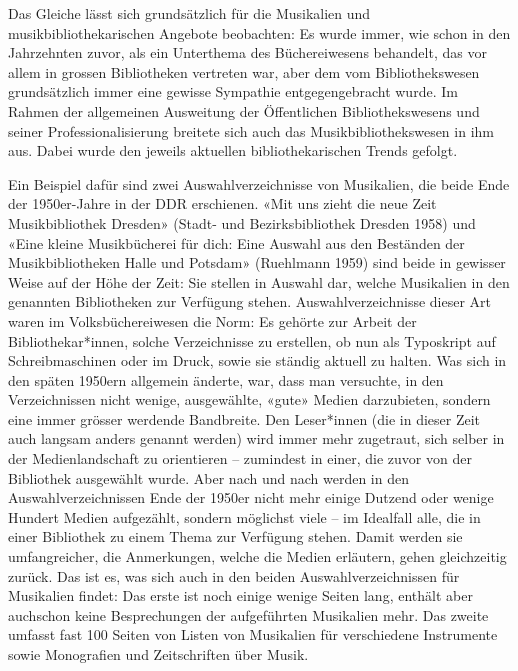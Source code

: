 \documentclass[a4paper,
fontsize=11pt,
oneside,
numbers=noperiodatend,
parskip=half-,
bibliography=totoc,
final
]{scrartcl}
\begin{document}
Das Gleiche lässt sich grundsätzlich für die Musikalien und
musikbibliothekarischen Angebote beobachten: Es wurde immer, wie schon
in den Jahrzehnten zuvor, als ein Unterthema des Büchereiwesens
behandelt, das vor allem in grossen Bibliotheken vertreten war, aber dem
vom Bibliothekswesen grundsätzlich immer eine gewisse Sympathie
entgegengebracht wurde. Im Rahmen der allgemeinen Ausweitung der
Öffentlichen Bibliothekswesens und seiner Professionalisierung breitete
sich auch das Musikbibliothekswesen in ihm aus. Dabei wurde den jeweils
aktuellen bibliothekarischen Trends gefolgt.

Ein Beispiel dafür sind zwei Auswahlverzeichnisse von Musikalien, die
beide Ende der 1950er-Jahre in der DDR erschienen. «Mit uns zieht die
neue Zeit Musikbibliothek Dresden» (Stadt- und Bezirksbibliothek Dresden
1958) und «Eine kleine Musikbücherei für dich: Eine Auswahl aus den
Beständen der Musikbibliotheken Halle und Potsdam» (Ruehlmann 1959) sind
beide in gewisser Weise auf der Höhe der Zeit: Sie stellen in Auswahl
dar, welche Musikalien in den genannten Bibliotheken zur Verfügung
stehen. Auswahlverzeichnisse dieser Art waren im Volksbüchereiwesen die
Norm: Es gehörte zur Arbeit der Bibliothekar*innen, solche Verzeichnisse
zu erstellen, ob nun als Typoskript auf Schreibmaschinen oder im Druck,
sowie sie ständig aktuell zu halten. Was sich in den späten 1950ern
allgemein änderte, war, dass man versuchte, in den Verzeichnissen nicht
wenige, ausgewählte, «gute» Medien darzubieten, sondern eine immer
grösser werdende Bandbreite. Den Leser*innen (die in dieser Zeit auch
langsam anders genannt werden) wird immer mehr zugetraut, sich selber in
der Medienlandschaft zu orientieren -- zumindest in einer, die zuvor von
der Bibliothek ausgewählt wurde. Aber nach und nach werden in den
Auswahlverzeichnissen Ende der 1950er nicht mehr einige Dutzend oder
wenige Hundert Medien aufgezählt, sondern möglichst viele -- im
Idealfall alle, die in einer Bibliothek zu einem Thema zur Verfügung
stehen. Damit werden sie umfangreicher, die Anmerkungen, welche die
Medien erläutern, gehen gleichzeitig zurück. Das ist es, was sich auch
in den beiden Auswahlverzeichnissen für Musikalien findet: Das erste ist
noch einige wenige Seiten lang, enthält aber auchschon keine
Besprechungen der aufgeführten Musikalien mehr. Das zweite umfasst fast
100 Seiten von Listen von Musikalien für verschiedene Instrumente sowie
Monografien und Zeitschriften über Musik.
\end{document}
